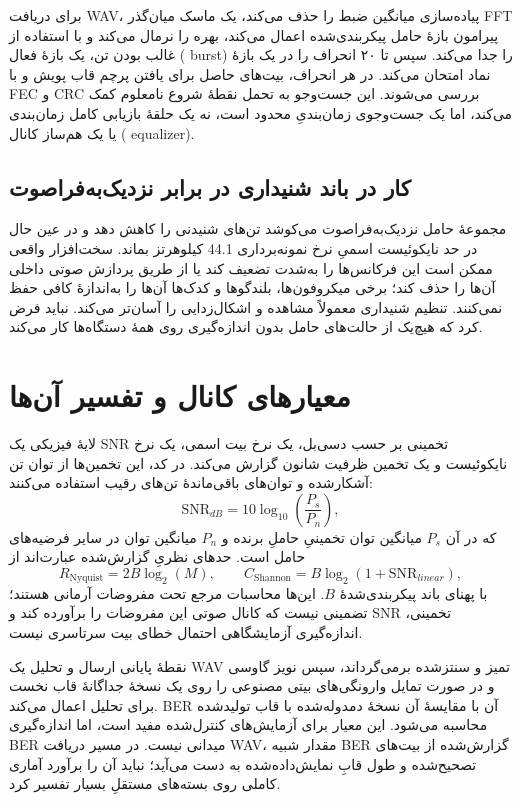 \documentclass[12pt,a4paper]{article}
\providecommand{\lr}[1]{\foreignlanguage{english}{\begingroup\hyphenchar\font=-1 #1\endgroup}}
\begin{document}
برای دریافت \lr{WAV}، پیاده‌سازی میانگین ضبط را حذف می‌کند، یک ماسک میان‌گذر \lr{FFT} پیرامون بازۀ حامل پیکربندی‌شده اعمال می‌کند، بهره را نرمال می‌کند و با استفاده از غالب بودن تن، یک بازۀ فعال (\lr{burst}) را جدا می‌کند. سپس تا ۲۰ انحراف را در یک بازۀ نماد امتحان می‌کند. در هر انحراف، بیت‌های حاصل برای یافتن پرچم قاب پویش و با \lr{FEC} و \lr{CRC} بررسی می‌شوند. این جست‌وجو به تحمل نقطۀ شروع نامعلوم کمک می‌کند، اما یک جست‌وجوی زمان‌بندیِ محدود است، نه یک حلقۀ بازیابی کامل زمان‌بندی یا یک هم‌ساز کانال (\lr{equalizer}).

\subsection{کار در باند شنیداری در برابر نزدیک‌به‌فراصوت}
مجموعۀ حامل نزدیک‌به‌فراصوت می‌کوشد تن‌های شنیدنی را کاهش دهد و در عین حال در حد نایکوئیست اسمیِ نرخ نمونه‌برداری \lr{44.1} کیلوهرتز بماند. سخت‌افزار واقعی ممکن است این فرکانس‌ها را به‌شدت تضعیف کند یا از طریق پردازش صوتی داخلی آن‌ها را حذف کند؛ برخی میکروفون‌ها، بلندگوها و کدک‌ها آن‌ها را به‌اندازۀ کافی حفظ نمی‌کنند. تنظیم شنیداری معمولاً مشاهده و اشکال‌زدایی را آسان‌تر می‌کند. نباید فرض کرد که هیچ‌یک از حالت‌های حامل بدون اندازه‌گیری روی همۀ دستگاه‌ها کار می‌کند.

\section{معیارهای کانال و تفسیر آن‌ها}
\label{sec:metrics}

لایۀ فیزیکی یک \lr{SNR} تخمینی بر حسب دسی‌بل، یک نرخ بیت اسمی، یک نرخ نایکوئیست و یک تخمین ظرفیت شانون گزارش می‌کند. در کد، این تخمین‌ها از توان تن آشکارشده و توان‌های باقی‌ماندۀ تن‌های رقیب استفاده می‌کنند:
\[
    \mathrm{SNR}_{dB}=10\log_{10}\!\left(\frac{P_s}{P_n}\right),
\]
که در آن $P_s$ میانگین توان تخمینیِ حاملِ برنده و $P_n$ میانگین توان در سایر فرضیه‌های حامل است. حدهای نظریِ گزارش‌شده عبارت‌اند از
\[
    R_{\mathrm{Nyquist}}=2B\log_2(M), \qquad
    C_{\mathrm{Shannon}}=B\log_2(1+\mathrm{SNR}_{linear}),
\]
با پهنای باند پیکربندی‌شدۀ $B$. این‌ها محاسبات مرجع تحت مفروضات آرمانی هستند؛ تضمینی نیست که کانال صوتی این مفروضات را برآورده کند و \lr{SNR} تخمینی، اندازه‌گیری آزمایشگاهی احتمال خطای بیت سرتاسری نیست.

نقطۀ پایانی ارسال و تحلیل یک \lr{WAV} تمیز و سنتز‌شده برمی‌گرداند، سپس نویز گاوسی و در صورت تمایل وارونگی‌های بیتی مصنوعی را روی یک نسخۀ جداگانۀ قاب نخست برای تحلیل اعمال می‌کند. \lr{BER} آن با مقایسۀ آن نسخۀ دمدوله‌شده با قاب تولیدشده محاسبه می‌شود. این معیار برای آزمایش‌های کنترل‌شده مفید است، اما اندازه‌گیری \lr{BER} میدانی نیست. در مسیر دریافت \lr{WAV}، مقدار شبیه‌\lr{BER} گزارش‌شده از بیت‌های تصحیح‌شده و طول قابِ نمایش‌داده‌شده به دست می‌آید؛ نباید آن را برآورد آماری کاملی روی بسته‌های مستقلِ بسیار تفسیر کرد.
\end{document}
